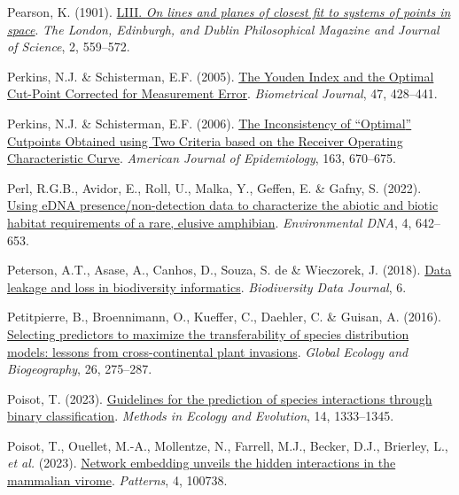 \documentclass[
  letterpaper,
]{scrbook}
\newlength{\cslhangindent}
\newenvironment{CSLReferences}[2] %
 {\begin{list}{}{%
  \setlength{\itemindent}{0pt}
  \setlength{\leftmargin}{0pt}
  \setlength{\parsep}{0pt}
  \ifodd #1
   \setlength{\leftmargin}{\cslhangindent}
   \setlength{\itemindent}{-1\cslhangindent}
  \fi
  \setlength{\itemsep}{#2\baselineskip}}}
 {\end{list}}
\begin{document}
\begin{CSLReferences}{1}{0}
Pearson, K. (1901).
\href{https://doi.org/10.1080/14786440109462720}{LIII. {\emph{On lines
and planes of closest fit to systems of points in space}}}. \emph{The
London, Edinburgh, and Dublin Philosophical Magazine and Journal of
Science}, 2, 559--572.

Perkins, N.J. \& Schisterman, E.F. (2005).
\href{https://doi.org/10.1002/bimj.200410133}{The Youden Index and the
Optimal Cut-Point Corrected for Measurement Error}. \emph{Biometrical
Journal}, 47, 428--441.

Perkins, N.J. \& Schisterman, E.F. (2006).
\href{https://doi.org/10.1093/aje/kwj063}{The Inconsistency of
{``}Optimal{''} Cutpoints Obtained using Two Criteria based on the
Receiver Operating Characteristic Curve}. \emph{American Journal of
Epidemiology}, 163, 670--675.

Perl, R.G.B., Avidor, E., Roll, U., Malka, Y., Geffen, E. \& Gafny, S.
(2022). \href{https://doi.org/10.1002/edn3.276}{Using eDNA
presence/non{-}detection data to characterize the abiotic and biotic
habitat requirements of a rare, elusive amphibian}. \emph{Environmental
DNA}, 4, 642--653.

Peterson, A.T., Asase, A., Canhos, D., Souza, S. de \& Wieczorek, J.
(2018). \href{https://doi.org/10.3897/bdj.6.e26826}{Data leakage and
loss in biodiversity informatics}. \emph{Biodiversity Data Journal}, 6.

Petitpierre, B., Broennimann, O., Kueffer, C., Daehler, C. \& Guisan, A.
(2016). \href{https://doi.org/10.1111/geb.12530}{Selecting predictors to
maximize the transferability of species distribution models: lessons
from cross{-}continental plant invasions}. \emph{Global Ecology and
Biogeography}, 26, 275--287.

Poisot, T. (2023).
\href{https://doi.org/10.1111/2041-210x.14071}{Guidelines for the
prediction of species interactions through binary classification}.
\emph{Methods in Ecology and Evolution}, 14, 1333--1345.

Poisot, T., Ouellet, M.-A., Mollentze, N., Farrell, M.J., Becker, D.J.,
Brierley, L., \emph{et al.} (2023).
\href{https://doi.org/10.1016/j.patter.2023.100738}{Network embedding
unveils the hidden interactions in the mammalian virome}.
\emph{Patterns}, 4, 100738.


\end{CSLReferences}
\end{document}
